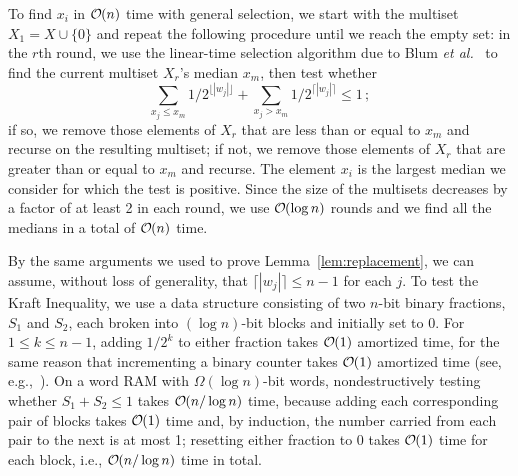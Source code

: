 \documentclass[runningheads]{llncs}
\newcommand{\Oh}[1]
    {\ensuremath{\mathcal{O} \hspace{-.5ex} \left( {#1} \right)}}
\begin{document}
To find $x_i$ in $\Oh{n}$ time with general selection, we start with the multiset \(X_1 = X \cup \{0\}\) and repeat the following procedure until we reach the empty set: in the $r$th round, we use the linear-time selection algorithm due to Blum {\it et al.}~\cite{BFP+73} to find the current multiset $X_r$'s median $x_m$, then test whether
\[\sum_{x_j \leq x_m} 1 / 2^{\lfloor |w_j| \rfloor} +
    \sum_{x_j > x_m} 1 / 2^{\lceil |w_j| \rceil}
\leq 1\,;\]
if so, we remove those elements of $X_r$ that are less than or equal to $x_m$ and recurse on the resulting multiset; if not, we remove those elements of $X_r$ that are greater than or equal to $x_m$ and recurse.  The element $x_i$ is the largest median we consider for which the test is positive.  Since the size of the multisets decreases by a factor of at least 2 in each round, we use $\Oh{\log n}$ rounds and we find all the medians in a total of $\Oh{n}$ time.

By the same arguments we used to prove Lemma~\ref{lem:replacement}, we can assume, without loss of generality, that \(\lceil |w_j| \rceil \leq n - 1\) for each $j$.  To test the Kraft Inequality, we use a data structure consisting of two $n$-bit binary fractions, $S_1$ and $S_2$, each broken into \((\log n)\)-bit blocks and initially set to 0.  For \(1 \leq k \leq n - 1\), adding \(1 / 2^k\) to either fraction takes $\Oh{1}$ amortized time, for the same reason that incrementing a binary counter takes $\Oh{1}$ amortized time (see, e.g.,~\cite[Section 17.3]{CLRS01}).  On a word RAM with \(\Omega (\log n)\)-bit words, nondestructively testing whether \(S_1 + S_2 \leq 1\) takes $\Oh{n / \log n}$ time, because adding each corresponding pair of blocks takes $\Oh{1}$ time and, by induction, the number carried from each pair to the next is at most 1; resetting either fraction to 0 takes $\Oh{1}$ time for each block, i.e., $\Oh{n / \log n}$ time in total.
\end{document}
